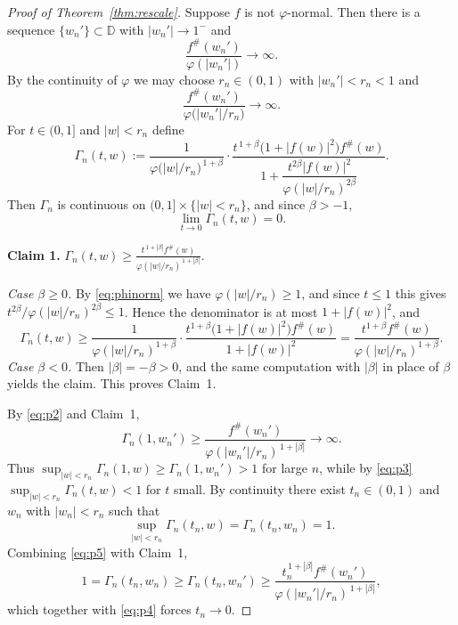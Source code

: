 \documentclass[11pt,reqno]{amsart}
\theoremstyle{definition}
\newcommand{\D}{\mathbb{D}}
\begin{document}
\begin{proof}[Proof of Theorem~\textup{\ref{thm:rescale}}]
Suppose $f$ is not $\varphi$-normal. Then there is a sequence $\{w_{n}'\}\subset\D$ with
$|w_{n}'|\to1^{-}$ and
\begin{equation}\label{eq:p1}
\frac{f^{\#}(w_{n}')}{\varphi(|w_{n}'|)}\longrightarrow\infty.
\end{equation}
By the continuity of $\varphi$ we may choose $r_{n}\in(0,1)$ with $|w_{n}'|<r_{n}<1$ and
\begin{equation}\label{eq:p2}
\frac{f^{\#}(w_{n}')}{\varphi\big(|w_{n}'|/r_{n}\big)}\longrightarrow\infty.
\end{equation}
For $t\in(0,1]$ and $|w|<r_{n}$ define
\[
\Gamma_{n}(t,w):=\frac{1}{\varphi\big(|w|/r_{n}\big)^{\,1+\beta}}\cdot
\frac{t^{\,1+\beta}\big(1+|f(w)|^{2}\big)f^{\#}(w)}
{1+\dfrac{t^{2\beta}|f(w)|^{2}}{\varphi(|w|/r_{n})^{2\beta}}}.
\]
Then $\Gamma_{n}$ is continuous on $(0,1]\times\{|w|<r_{n}\}$, and since $\beta>-1$,
\begin{equation}\label{eq:p3}
\lim_{t\to0}\Gamma_{n}(t,w)=0.
\end{equation}

\smallskip
\noindent\textbf{Claim 1.}
$\displaystyle \Gamma_{n}(t,w)\ge\frac{t^{\,1+|\beta|}f^{\#}(w)}{\varphi(|w|/r_{n})^{\,1+|\beta|}}.$

\smallskip
\noindent\emph{Case $\beta\ge0$.} By \eqref{eq:phinorm} we have $\varphi(|w|/r_{n})\ge1$,
and since $t\le1$ this gives $t^{2\beta}/\varphi(|w|/r_{n})^{2\beta}\le1$. Hence the
denominator is at most $1+|f(w)|^{2}$, and
\[
\Gamma_{n}(t,w)\ge\frac{1}{\varphi(|w|/r_{n})^{1+\beta}}\cdot
\frac{t^{1+\beta}\big(1+|f(w)|^{2}\big)f^{\#}(w)}{1+|f(w)|^{2}}
=\frac{t^{1+\beta}f^{\#}(w)}{\varphi(|w|/r_{n})^{1+\beta}}.
\]
\emph{Case $\beta<0$.} Then $|\beta|=-\beta>0$, and the same computation with $|\beta|$ in
place of $\beta$ yields the claim. This proves Claim~1.

\smallskip
By \eqref{eq:p2} and Claim~1,
\begin{equation}\label{eq:p4}
\Gamma_{n}(1,w_{n}')\ge\frac{f^{\#}(w_{n}')}{\varphi(|w_{n}'|/r_{n})^{\,1+|\beta|}}
\longrightarrow\infty.
\end{equation}
Thus $\sup_{|w|<r_{n}}\Gamma_{n}(1,w)\ge\Gamma_{n}(1,w_{n}')>1$ for large $n$, while by
\eqref{eq:p3} $\sup_{|w|<r_{n}}\Gamma_{n}(t,w)<1$ for $t$ small. By continuity there exist
$t_{n}\in(0,1)$ and $w_{n}$ with $|w_{n}|<r_{n}$ such that
\begin{equation}\label{eq:p5}
\sup_{|w|<r_{n}}\Gamma_{n}(t_{n},w)=\Gamma_{n}(t_{n},w_{n})=1.
\end{equation}
Combining \eqref{eq:p5} with Claim~1,
\[
1=\Gamma_{n}(t_{n},w_{n})\ge\Gamma_{n}(t_{n},w_{n}')\ge
\frac{t_{n}^{\,1+|\beta|}f^{\#}(w_{n}')}{\varphi(|w_{n}'|/r_{n})^{\,1+|\beta|}},
\]
which together with \eqref{eq:p4} forces $t_{n}\to0$.


\end{proof}
\end{document}
